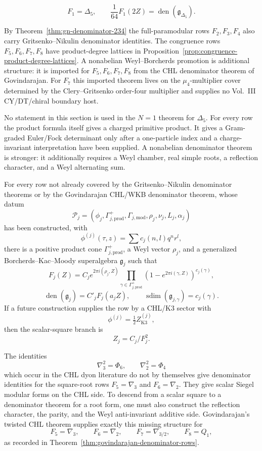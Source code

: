 \documentclass[11pt]{memoir}
\newcommand{\sdim}{\operatorname{sdim}}
\newcommand{\autcor}{\mathfrak{g}_{\Delta_5}}
\begin{document}
$$F_1=\Delta_5,\qquad
\frac1{64}F_1(2Z)=\operatorname{den}(\autcor).$$

By Theorem~\ref{thm:gn-denominator-234} the full-paramodular rows
$F_2,F_3,F_4$ also carry Gritsenko--Nikulin denominator identities.
The congruence rows $F_5,F_6,F_7,F_8$ have product-degree lattices in
Proposition~\ref{prop:congruence-product-degree-lattices}.  A
nonabelian Weyl--Borcherds promotion is additional structure: it is
imported for $F_5,F_6,F_7,F_8$ from the CHL denominator theorem of
Govindarajan.  For $F_7$ this imported theorem lives on the
$\mu_4$-multiplier cover determined by the Clery--Gritsenko order-four
multiplier and supplies no Vol.~III CY/DT/chiral boundary host.

\begin{proposition}
\label{prop:extension-quarantine}
No statement in this section is used in the $N=1$ theorem for
$\Delta_5$.  For every row the product formula itself gives a charged
primitive product.  It gives a Gram-graded Euler/Fock determinant only
after a one-particle index and a charge-invariant interpretation have
been supplied.
A nonabelian denominator theorem is stronger: it additionally requires a
Weyl chamber, real simple roots, a reflection character, and a Weyl
alternating sum.
\end{proposition}

\begin{conjecture}
For every row not already covered by the Gritsenko--Nikulin denominator
theorems or by the Govindarajan CHL/WKB denominator theorem, whose datum
$$
\mathscr P_j=(\phi_j,\Gamma_{j,\mathrm{prod}}^+,
\Gamma_{j,\mathrm{mod}},\rho_j,\nu_j,L_j,\alpha_j)
$$
has been constructed, with
$$\phi^{(j)}(\tau,z)=\sum c_j(n,l)q^nr^l,$$
there is a positive product cone $\Gamma_{j,\mathrm{prod}}^+$, a Weyl vector $\rho_j$, and a
generalized Borcherds--Kac--Moody superalgebra $\mathfrak g_j$ such that
$$F_j(Z)=C_j e^{2\pi i(\rho_j,Z)}
\prod_{\gamma\in\Gamma_{j,\mathrm{prod}}^+}(1-e^{2\pi i(\gamma,Z)})^{c_j(\gamma)},$$
$$\operatorname{den}(\mathfrak g_j)=C'_jF_j(a_jZ),\qquad
\sdim(\mathfrak g_{j,\gamma})=c_j(\gamma).$$
If a future construction supplies the row by a CHL/K3 sector with
$$\phi^{(j)}=\tfrac12Z^{(j)}_{\mathrm{K3}},$$
then the scalar-square branch is
$$Z_j=C_j/F_j^2.$$
\end{conjecture}

\begin{proposition}
\label{prop:chl-square-root-separation}
The identities
$$
\nabla_3^2=\Phi_6,\qquad \nabla_2^2=\Phi_4
$$
which occur in the CHL dyon literature do not by themselves give
denominator identities for the square-root rows $F_5=\nabla_3$ and
$F_6=\nabla_2$.  They give scalar Siegel modular forms on the CHL side.
To descend from a scalar square to a denominator theorem for a root
form, one must also construct the reflection character, the parity, and
the Weyl anti-invariant additive side.  Govindarajan's twisted CHL
theorem supplies exactly this missing structure for
$$F_5=\nabla_3,\qquad F_6=\nabla_2,\qquad
F_7=\nabla_{3/2},\qquad F_8=Q_1,$$
as recorded in Theorem~\ref{thm:govindarajan-denominator-rows}.
\end{proposition}
\end{document}
